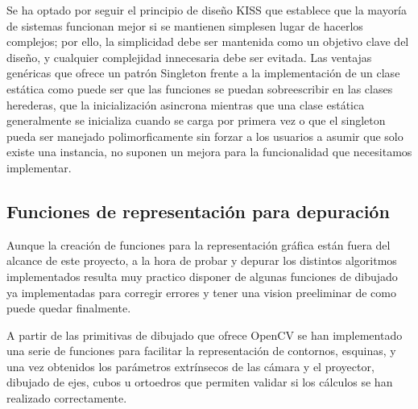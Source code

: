 Se ha optado por seguir el principio de diseño \acs{KISS} que establece que la mayoría de sistemas funcionan mejor si se mantienen simplesen lugar de hacerlos complejos; por ello, la simplicidad debe ser mantenida como un objetivo clave del diseño, y cualquier complejidad innecesaria debe ser evitada. Las ventajas genéricas que ofrece un patrón Singleton frente a la implementación de un clase estática como puede ser que las funciones se puedan sobreescribir en las clases herederas, que la inicialización asincrona mientras que una clase estática generalmente se inicializa cuando se carga por primera vez o que el singleton pueda ser manejado polimorficamente sin forzar a los usuarios a asumir que solo existe una instancia, no suponen un mejora para la funcionalidad que necesitamos implementar. 

\subsection{Funciones de representación para depuración}
Aunque la creación de funciones para la representación gráfica están fuera del alcance de este proyecto, a la hora de probar y depurar los distintos algoritmos implementados resulta muy practico disponer de algunas funciones de dibujado ya implementadas para corregir errores y tener una vision preeliminar de como puede quedar finalmente.

A partir de las primitivas de dibujado que ofrece OpenCV se han implementado una serie de funciones para facilitar la representación de contornos, esquinas, y una vez obtenidos los parámetros extrínsecos de las cámara y el proyector, dibujado de ejes, cubos u ortoedros que permiten validar si los cálculos se han realizado correctamente.





